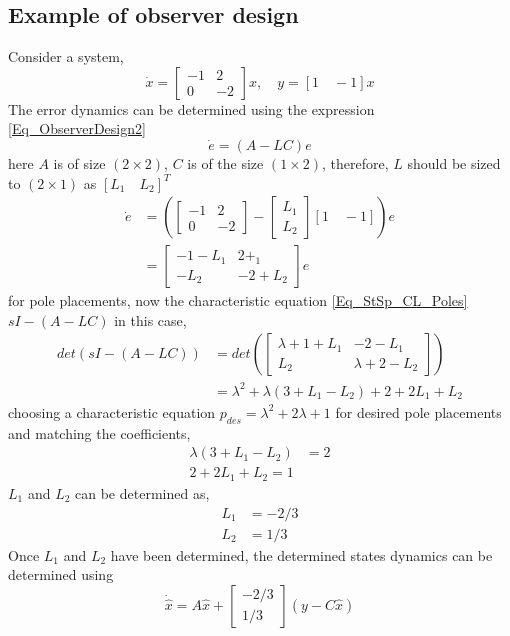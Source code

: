 \subsection{Example of observer design}

Consider a system,
\begin{equation}
	\dot{x} = \begin{bmatrix}
		-1 & 2 \\ 0 & -2
	\end{bmatrix} x, \quad y = [1 \quad -1]x
\end{equation}
The error dynamics can be determined using the expression \eqref{Eq_ObserverDesign2}
\begin{equation*}
		\dot{e} = (A - LC) e
\end{equation*}
here $A$ is of size $(2\times2)$, $C$ is of the size $(1\times2)$, therefore, $L$ should be sized to $(2\times1)$ as $[L_{1} \quad L_{2}]^{T}$
\begin{align*}
	\dot{e} &= \left(\begin{bmatrix}
	-1 & 2 \\ 0 & -2
	\end{bmatrix} - \begin{bmatrix}L_{1} \\ L_{2} \end{bmatrix} [1 \quad -1] \right) e \\
			&= \begin{bmatrix}
				-1-L_{1} & 2 + _{1} \\ -L_{2} & -2+L_{2}
			\end{bmatrix} e
\end{align*}
for pole placements, now the characteristic equation \eqref{Eq_StSp_CL_Poles} $sI - (A - LC)$ in this case,
\begin{align*}
	det(sI - (A - LC)) &= det\left(\begin{bmatrix}
	\lambda + 1 + L_{1} & -2-L_{1} \\ L_{2} & \lambda + 2 - L_{2}
	\end{bmatrix} \right) \\
					&= \lambda^{2} + \lambda(3 + L_{1} - L_{2}) + 2 + 2L_{1} + L_{2}
\end{align*}
choosing a characteristic equation $p_{des} = \lambda^{2} + 2 \lambda + 1$ for desired pole placements and matching the coefficients,
\begin{align}
	\lambda(3 + L_{1} - L_{2}) &= 2 \\
	2 + 2L_{1} + L_{2} = 1
\end{align}
$L_1$ and $L_2$ can be determined as,
\begin{align}
	L_1 &= -2 /3 \\
	L_2 &= 1 / 3
\end{align}
Once $L_1$ and $L_2$ have been determined, the determined states dynamics can be determined using
\begin{equation}
	\dot{\hat{x}} = A \hat{x} + \begin{bmatrix}
		-2/3 \\ 1 / 3
	\end{bmatrix} (y - C \hat{x})
\end{equation}


